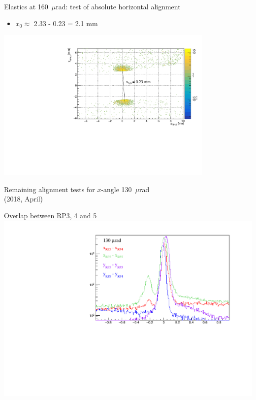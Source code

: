 \documentclass{beamer}
\begin{document}
\begin{frame}\scriptsize
	\begin{block}{Elastics at 160~$\mu$rad: test of absolute horizontal alignment}
    		\begin{itemize}
			\item $x_{0}\approx$ 2.33 - 0.23 = 2.1 mm
		\end{itemize}
	\begin{center}
            \includegraphics[width=0.8\textwidth]{beam_spot.pdf}
	\end{center}
	\end{block}
	
\end{frame}

\begin{frame}
	\begin{center}
	\Large
	Remaining alignment tests for $x$-angle 130~$\mu$rad
	\\ {\small (2018, April)}
	\end{center}
\end{frame}

\begin{frame}\scriptsize
	\begin{block}{Overlap between RP3, 4 and 5}
             \includegraphics[width=1.0\textwidth]{130_murad_overlap.pdf}
	\end{block}
	
\end{frame}
\end{document}
